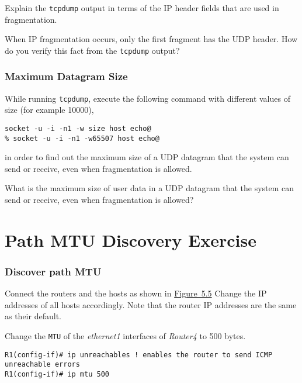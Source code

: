\documentclass{../UTNetLab}
\begin{document}
    \begin{report}
    \item Explain the \lstinline{tcpdump} output in terms of the IP header fields that are used in fragmentation.

    \item When IP fragmentation occurs, only the first fragment has the UDP header.
    How do you verify this fact from the \lstinline{tcpdump} output?
    \end{report}


\section{Maximum Datagram Size}
\label{sec:MaxDatagramSize}
    While running \lstinline{tcpdump}, execute the following command with different values of size (for example 10000),
    \begin{lstlisting}[emph={size, host}]
socket -u -i -n1 -w size host echo@
% socket -u -i -n1 -w65507 host echo@
    \end{lstlisting}
    in order to find out the maximum size of a UDP datagram that the system can send or receive, even when fragmentation is allowed.

    \begin{report}
    \item What is the maximum size of user data in a UDP datagram that the system can send or receive, even when fragmentation is allowed?
    \end{report}


\part{Path MTU Discovery Exercise}\label{sec:PMTUD}

\section{Discover path MTU}
    Connect the routers and the hosts as shown in \hyperref[fig:5.5]{Figure~5.5} Change the IP addresses of all hosts accordingly.
    Note that the router IP addresses are the same as their default.


    Change the \texttt{MTU} of the \textit{ethernet1} interfaces of \textit{Router4} to 500 bytes.
    \begin{lstlisting}[language={cisco}]
R1(config-if)# ip unreachables ! enables the router to send ICMP unreachable errors
R1(config-if)# ip mtu 500
    \end{lstlisting}
\end{document}
